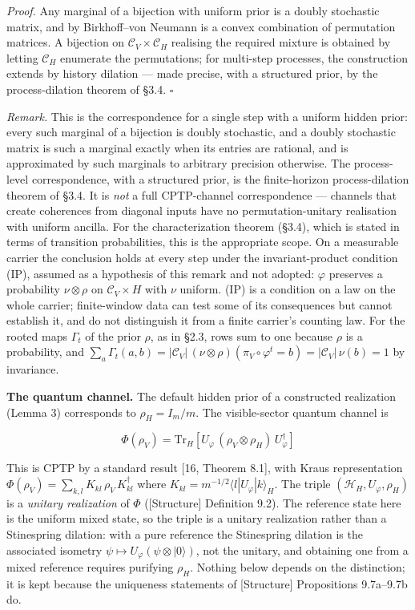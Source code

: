 \documentclass[
]{article}
\begin{document}
\emph{Proof.} Any marginal of a bijection with uniform prior is a doubly
stochastic matrix, and by Birkhoff--von Neumann is a convex combination
of permutation matrices. A bijection on
\(\mathcal{C}_V \times \mathcal{C}_H\) realising the required mixture is
obtained by letting \(\mathcal{C}_H\) enumerate the permutations; for
multi-step processes, the construction extends by history dilation ---
made precise, with a structured prior, by the process-dilation theorem
of §3.4. \(\square\)

\emph{Remark.} This is the correspondence for a single step with a
uniform hidden prior: every such marginal of a bijection is doubly
stochastic, and a doubly stochastic matrix is such a marginal exactly
when its entries are rational, and is approximated by such marginals to
arbitrary precision otherwise. The process-level correspondence, with a
structured prior, is the finite-horizon process-dilation theorem of
§3.4. It is \emph{not} a full CPTP-channel correspondence --- channels
that create coherences from diagonal inputs have no permutation-unitary
realisation with uniform ancilla. For the characterization theorem
(§3.4), which is stated in terms of transition probabilities, this is
the appropriate scope. On a measurable carrier the conclusion holds at
every step under the invariant-product condition (IP), assumed as a
hypothesis of this remark and not adopted: \(\varphi\) preserves a
probability \(\nu \otimes \rho\) on \(\mathcal{C}_V \times H\) with
\(\nu\) uniform. (IP) is a condition on a law on the whole carrier;
finite-window data can test some of its consequences but cannot
establish it, and do not distinguish it from a finite carrier's counting
law. For the rooted maps \(\Gamma_t\) of the prior \(\rho\), as in §2.3,
rows sum to one because \(\rho\) is a probability, and
\(\sum_a \Gamma_t(a, b) = |\mathcal{C}_V|\,(\nu \otimes \rho)(\pi_V \circ \varphi^t = b) = |\mathcal{C}_V|\,\nu(b) = 1\)
by invariance.

\textbf{The quantum channel.} The default hidden prior of a constructed
realization (Lemma 3) corresponds to \(\rho_H = I_m/m\). The
visible-sector quantum channel is

\[\Phi(\rho_V) = \mathrm{Tr}_H\!\left[U_\varphi\,(\rho_V \otimes \rho_H)\,U_\varphi^\dagger\right]\]

This is CPTP by a standard result {[}16, Theorem 8.1{]}, with Kraus
representation
\(\Phi(\rho_V) = \sum_{k,l} K_{kl}\,\rho_V\,K_{kl}^\dagger\) where
\(K_{kl} = m^{-1/2}\langle l|U_\varphi|k\rangle_H\). The triple
\((\mathcal{H}_H, U_\varphi, \rho_H)\) is a \emph{unitary realization}
of \(\Phi\) ({[}Structure{]} Definition 9.2). The reference state here
is the uniform mixed state, so the triple is a unitary realization
rather than a Stinespring dilation: with a pure reference the
Stinespring dilation is the associated isometry
\(\psi \mapsto U_\varphi(\psi \otimes |0\rangle)\), not the unitary, and
obtaining one from a mixed reference requires purifying \(\rho_H\).
Nothing below depends on the distinction; it is kept because the
uniqueness statements of {[}Structure{]} Propositions 9.7a--9.7b do.
\end{document}
